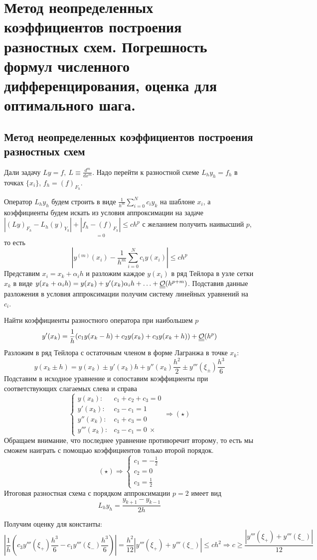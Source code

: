 \section{Метод неопределенных коэффициентов построения
  разностных схем. Погрешность формул
  численного дифференцирования, оценка для оптимального шага.}

\subsection*{Метод неопределенных коэффициентов построения разностных схем}
Дали задачу $Ly=f,\ L\equiv\frac{d^m}{dx^m}$. Надо перейти к разностной схеме
$L_hy_h=f_h$ в точках $\{x_i\}$, $f_h=(f)_{F_h}$.

Оператор $L_hy_h$ будем строить в виде $\frac{1}{h^m}\sum\limits_{i=0}^{N}c_iy_k$
на шаблоне $x_i$, а коэффициенты будем искать из условия аппроксимации на задаче
$|(Ly)_{F_h}-L_h(y)_{Y_h}|+\underset{=0}{|f_h-(f)_{F_h}|}\leq ch^p$ с желанием
получить наивысший $p$, то есть
\[\left|y^{(m)}(x_i)-\frac{1}{h^m}\sum_{i=0}^{N}c_iy(x_i)\right|\leq ch^p\]
Представим $x_i=x_k+\alpha_ih$ и разложим каждое $y(x_i)$
в ряд Тейлора в узле сетки $x_k$ в виде $y(x_k+\alpha_ih)=y(x_k)+y'(x_k)\alpha_ih+\ldots+\underline{\underline{\mathcal{O}}}(h^{p+m})$.
Подставив данные разложения в условия аппроксимации получим систему линейных уравнений на $c_i$.

\begin{example}
  Найти коэффициенты разностного оператора при наибольшем $p$
  \[y'(x_k)=\frac{1}{h}(c_1y(x_k-h)+c_2y(x_k)+c_3y(x_k+h))+\underline{\underline{\mathcal{O}}}(h^p)\]
  Разложим в ряд Тейлора с остаточным членом в форме Лагранжа в точке $x_k$:
  \[y(x_k\pm h)=y(x_k)\pm y'(x_k)h+y''(x_k)\frac{h^2}{2}\pm y'''(\xi_{\pm})\frac{h^3}{6}\]
  Подставим в исходное уравнение и сопоставим коэффициенты при соответствующих слагаемых слева и справа
  \[\begin{cases}
      y(x_k):    & c_1+c_2+c_3=0     \\
      y'(x_k):   & c_3-c_1=1         \\
      y''(x_k):  & c_1+c_3=0         \\
      y'''(x_k): & c_3-c_1=0\ \times
    \end{cases}\Rightarrow (\star)\]
  Обращаем внимание, что последнее уравнение противоречит второму, то есть
  мы сможем наиграть с помощью коэффициентов только второй порядок.
  \[(\star)\Rightarrow\begin{cases}
      c_1=-\frac{1}{2} \\
      c_2=0            \\
      c_3=\frac{1}{2}
    \end{cases}\]
  Итоговая разностная схема с порядком аппроксимации $p=2$ имеет вид
  \[L_hy_h=\frac{y_{k+1}-y_{k-1}}{2h}\]

  Получим оценку для константы:
  \[\left|\frac{1}{h}(c_3y'''(\xi_{+})\frac{h^3}{6}-c_1y'''(\xi_{-})\frac{h^3}{6})\right|=\frac{h^2}{12}\left|y'''(\xi_{+})+y'''(\xi_{-})\right|\leq ch^2\Rightarrow c\geq\frac{|y'''(\xi_{+})+y'''(\xi_{-})|}{12}\]
\end{example}

